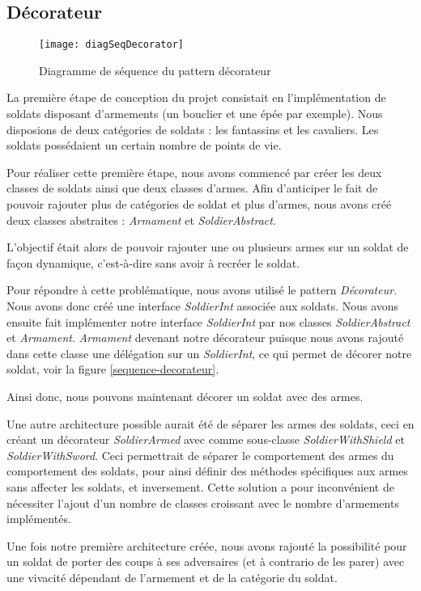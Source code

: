 \subsection{Décorateur}
\begin{figure}[h]
\begin{center}
    \texttt{[image: diagSeqDecorator]}
\end{center}
    \caption{Diagramme de séquence du pattern décorateur}
    \label{sequence-decorateur}
\end{figure}

La première étape de conception du projet consistait en l'implémentation de soldats disposant d'armements (un bouclier et une épée par exemple). Nous disposions de deux catégories de soldats : les fantassins et les cavaliers. Les soldats possédaient un certain nombre de points de vie.

Pour réaliser cette première étape, nous avons commencé par créer les deux classes de soldats ainsi que deux classes d'armes. Afin d'anticiper le fait de pouvoir rajouter plus de catégories de soldat et plus d'armes, nous avons créé deux classes abstraites : \emph{Armament} et \emph{SoldierAbstract}.  

L'objectif était alors de pouvoir rajouter une ou plusieurs armes sur un soldat de façon dynamique, c'est-à-dire sans avoir à recréer le soldat. 

Pour répondre à cette problématique, nous avons utilisé le pattern \emph{Décorateur}. 
Nous avons donc créé une interface \emph{SoldierInt} associée aux soldats. Nous avons ensuite fait implémenter notre interface \emph{SoldierInt} par nos classes \emph{SoldierAbstract} et \emph{Armament}. \emph{Armament} devenant notre décorateur puisque nous avons rajouté dans cette classe une délégation sur un \emph{SoldierInt}, ce qui permet de décorer notre soldat, voir la figure \vref{sequence-decorateur}.

Ainsi donc, nous pouvons maintenant décorer un soldat avec des armes.

Une autre architecture possible aurait été de séparer les armes des soldats, ceci en créant un décorateur \emph{SoldierArmed} avec comme sous-classe \emph{SoldierWithShield} et \emph{SoldierWithSword}. Ceci permettrait de séparer le comportement des armes du comportement des soldats, pour ainsi définir des méthodes spécifiques aux armes sans affecter les soldats, et inversement. Cette solution a pour inconvénient de nécessiter l'ajout d'un nombre de classes croissant avec le nombre d'armements implémentés.

Une fois notre première architecture créée, nous avons rajouté la possibilité pour un soldat de porter des coups à ses adversaires (et à contrario de les parer) avec une vivacité dépendant de l'armement et de la catégorie du soldat.
